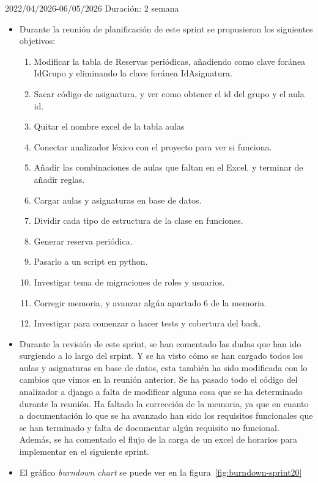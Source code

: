 \begin{Sprint}{20}{22/04/2026-06/05/2026}
	Duración: 2 semana
	\begin{itemize}	
		\item{}
		Durante la reunión de planificación de este sprint se propusieron los siguientes objetivos:
		\begin{enumerate}
			\item Modificar la tabla de Reservas periódicas, añadiendo como clave foránea IdGrupo y eliminando la clave foránea IdAsignatura.
			\item Sacar código de asignatura, y ver como obtener el id del grupo y el aula id.
			\item Quitar el nombre excel de la tabla aulas
			\item Conectar analizador léxico con el proyecto para ver si funciona.
			\item Añadir las combinaciones de aulas que faltan en el Excel, y terminar de añadir reglas.
			\item Cargar aulas y asignaturas en base de datos.
			\item Dividir cada tipo de estructura de la clase en funciones.
			\item Generar reserva periódica.
			\item Pasarlo a un script en python.
			\item Investigar tema de migraciones de roles y usuarios.
			\item Corregir memoria, y avanzar algún apartado 6 de la memoria.
			\item Investigar para comenzar a hacer tests y cobertura del back.
		\end{enumerate}
		\item{}
		Durante la revisión de este sprint, se han comentado las dudas que han ido surgiendo a lo largo del srpint. Y se ha visto cómo se han cargado todos los aulas y asignaturas en base de datos, esta también ha sido modificada con lo cambios que vimos en la reunión anterior. Se ha pasado todo el código del analizador a django a falta de modificar alguna cosa que se ha determinado durante la reunión. Ha faltado la corrección de la memoria, ya que en cuanto a documentación lo que se ha avanzado han sido los requisitos funcionales que se han terminado y falta de documentar algún requisito no funcional. Además, se ha comentado el flujo de la carga de un excel de horarios para implementar en el siguiente sprint.
		
		
		\item{}
		El gráfico \textit{burndown chart} se puede ver en la figura~\ref{fig:burndown-sprint20}
	\end{itemize}
\end{Sprint}

